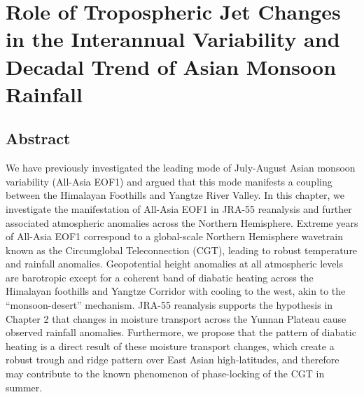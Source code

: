 \chapter{Role of Tropospheric Jet Changes in the Interannual Variability and Decadal Trend of Asian Monsoon Rainfall}


\section{Abstract}
We have previously investigated the leading mode of July-August Asian monsoon variability (All-Asia EOF1) and argued that this mode manifests a coupling between the Himalayan Foothills and Yangtze River Valley. In this chapter, we investigate the manifestation of All-Asia EOF1 in JRA-55 reanalysis and further associated atmospheric anomalies across the Northern Hemisphere. Extreme years of All-Asia EOF1 correspond to a global-scale Northern Hemisphere wavetrain known as the Circumglobal Teleconnection (CGT), leading to robust temperature and rainfall anomalies. Geopotential height anomalies at all atmospheric levels are barotropic except for a coherent band of diabatic heating across the Himalayan foothills and Yangtze Corridor with cooling to the west, akin to the ``monsoon-desert'' mechanism. JRA-55 reanalysis supports the hypothesis in Chapter 2 that changes in moisture transport across the Yunnan Plateau cause observed rainfall anomalies. Furthermore, we propose that the pattern of diabatic heating is a direct result of these moisture transport changes, which create a robust trough and ridge pattern over East Asian high-latitudes, and therefore may contribute to the known phenomenon of phase-locking of the CGT in summer. 

